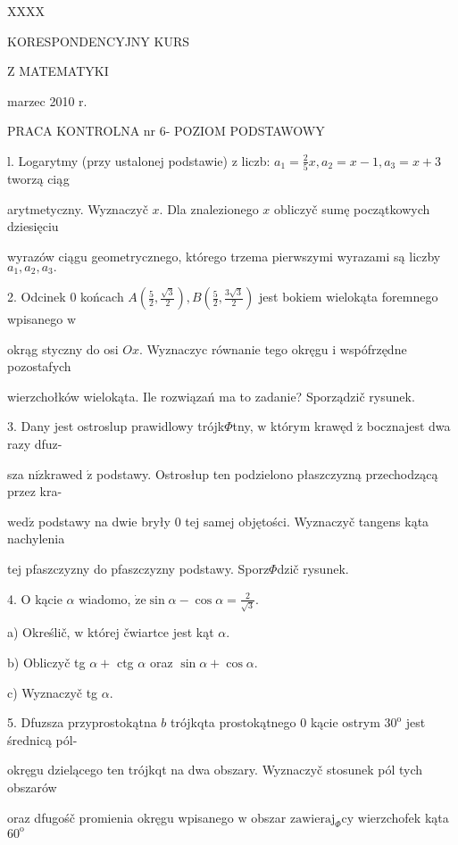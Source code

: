 \documentclass[a4paper,12pt]{article}
\begin{document}
XXXX

KORESPONDENCYJNY KURS

Z MATEMATYKI

marzec 2010 r.

PRACA KONTROLNA nr 6- POZIOM PODSTAWOWY

l. Logarytmy (przy ustalonej podstawie) $\mathrm{z}$ liczb: $a_{1}=\displaystyle \frac{2}{5}x, a_{2}=x-1, a_{3}=x+3$ tworzą ciąg

arytmetyczny. Wyznaczyč $x$. Dla znalezionego $x$ obliczyč sumę początkowych dziesięciu

wyrazów ciągu geometrycznego, którego trzema pierwszymi wyrazami są liczby $a_{1}, a_{2}, a_{3}.$

2. Odcinek $0$ końcach $A(\displaystyle \frac{5}{2},\frac{\sqrt{3}}{2}), B(\displaystyle \frac{5}{2},\frac{3\sqrt{3}}{2})$ jest bokiem wielokąta foremnego wpisanego $\mathrm{w}$

okrąg styczny do osi $Ox$. Wyznaczyc równanie tego okręgu $\mathrm{i}$ wspófrzędne pozostafych

wierzchołków wielokąta. Ile rozwiązań ma to zadanie? Sporządzič rysunek.

3. Dany jest ostroslup prawidlowy trójk$\Phi$tny, $\mathrm{w}$ którym krawęd $\acute{\mathrm{z}}$ bocznajest dwa razy dfuz-

sza $\mathrm{n}\mathrm{i}\dot{\mathrm{z}}$krawed $\acute{\mathrm{z}}$ podstawy. Ostrosłup ten podzielono płaszczyzną przechodzącą przez kra-

$\mathrm{w}\mathrm{e}\mathrm{d}\acute{\mathrm{z}}$ podstawy na dwie bryły $0$ tej samej objętości. Wyznaczyč tangens kąta nachylenia

tej pfaszczyzny do pfaszczyzny podstawy. Sporz$\Phi$dzič rysunek.

4. $\mathrm{O}$ kącie $\alpha$ wiadomo, $\displaystyle \dot{\mathrm{z}}\mathrm{e}\sin\alpha-\cos\alpha=\frac{2}{\sqrt{3}}.$

a) Określič, $\mathrm{w}$ której čwiartce jest kąt $\alpha.$

b) Obliczyč tg $\alpha+$ ctg $\alpha$ oraz $\sin\alpha+\cos\alpha.$

c) Wyznaczyč tg $\alpha.$

5. Dfuzsza przyprostokątna $b$ trójkqta prostokątnego $0$ kącie ostrym $30^{\mathrm{o}}$ jest średnicą pól-

okręgu dzielącego ten trójkqt na dwa obszary. Wyznaczyč stosunek pól tych obszarów

oraz dfugośč promienia okręgu wpisanego $\mathrm{w}$ obszar $\mathrm{z}\mathrm{a}\mathrm{w}\mathrm{i}\mathrm{e}\mathrm{r}\mathrm{a}\mathrm{j}_{\Phi}\mathrm{c}\mathrm{y}$ wierzchofek kąta $60^{\mathrm{o}}$
\end{document}
